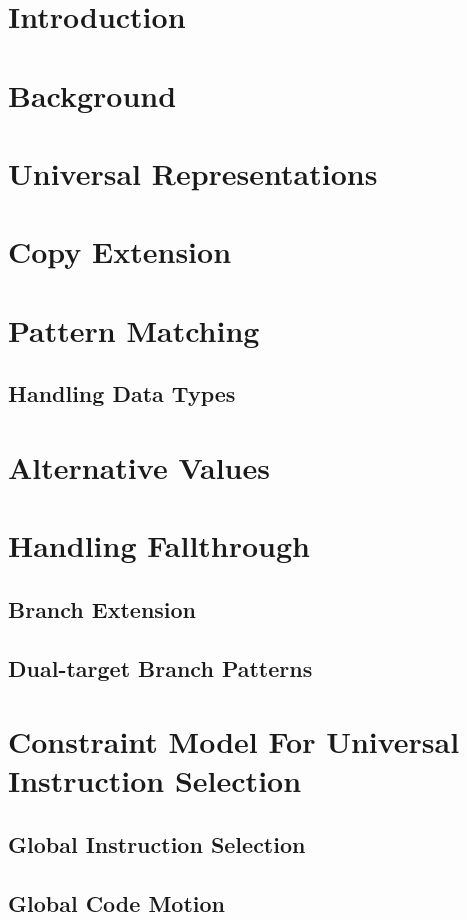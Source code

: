 \documentclass{book}
\begin{document}
\chapter{Introduction}

\chapter{Background}

\chapter{Universal Representations}

\chapter{Copy Extension}

\chapter{Pattern Matching}
\section{Handling Data Types}

\chapter{Alternative Values}

\chapter{Handling Fallthrough}
\section{Branch Extension}
\section{Dual-target Branch Patterns}

\chapter{Constraint Model For Universal Instruction Selection}
\section{Global Instruction Selection}
\section{Global Code Motion}
\end{document}
